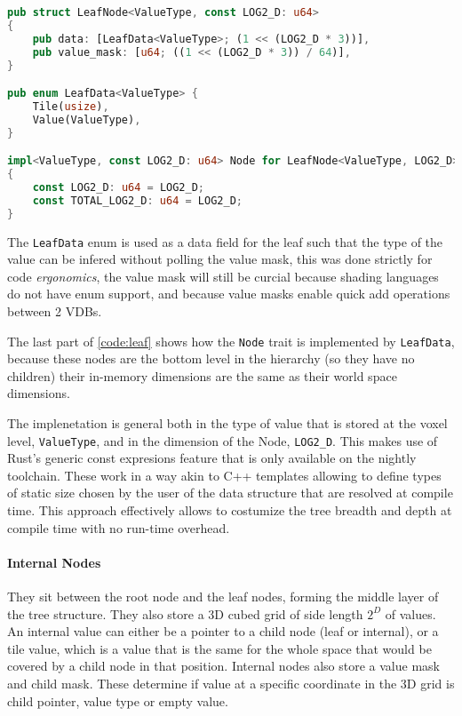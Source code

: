\begin{lstlisting}[language=rust, captionpos=b, caption={\texttt{LeafNode} definition},label={code:leaf}]
pub struct LeafNode<ValueType, const LOG2_D: u64>
{
    pub data: [LeafData<ValueType>; (1 << (LOG2_D * 3))],
    pub value_mask: [u64; ((1 << (LOG2_D * 3)) / 64)],
}

pub enum LeafData<ValueType> {
    Tile(usize),
    Value(ValueType),
}

impl<ValueType, const LOG2_D: u64> Node for LeafNode<ValueType, LOG2_D>
{
    const LOG2_D: u64 = LOG2_D;
    const TOTAL_LOG2_D: u64 = LOG2_D;
}
\end{lstlisting}

The \verb|LeafData| enum is used as a data field for the leaf such that the type of the value can be infered without polling the value mask, this was done strictly for code \emph{ergonomics}, the value mask will still be curcial because shading languages do not have enum support, and because value masks enable quick add operations between 2 VDBs.

The last part of \cref{code:leaf} shows how the \verb|Node| trait is implemented by \verb|LeafData|, because these nodes are the bottom level in the hierarchy (so they have no children) their in-memory dimensions are the same as their world space dimensions.

The implenetation is general both in the type of value that is stored at the voxel level, \verb|ValueType|, and in the dimension of the Node, \verb|LOG2_D|. This makes use of Rust's generic const expresions feature \supercite{rust:generic} that is only available on the nightly toolchain. These work in a way akin to C++ templates allowing to define types of static size chosen by the user of the data structure that are resolved at compile time. This approach effectively allows to costumize the tree breadth and depth at compile time with no run-time overhead.

\paragraph{Internal Nodes} They sit between the root node and the leaf nodes, forming the middle layer of the tree structure.
They also store a 3D cubed grid of side length $2^{D}$ of values. An internal value can either be a pointer to a child node (leaf or internal), or a tile value, which is a value that is the same for the whole space that would be covered by a child node in that position.
Internal nodes also store a value mask and child mask. These determine if value at a specific coordinate in the 3D grid is child pointer, value type or empty value.


